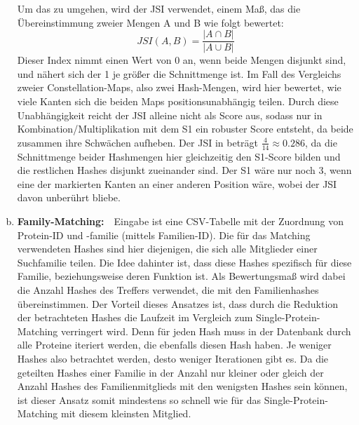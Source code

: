 \begin{enumerate}[a)]
                Um das zu umgehen, wird der \ac{JSI} verwendet, einem Maß, das die Übereinstimmung zweier Mengen A und B wie folgt bewertet:
                \begin{equation}
                    \label{equ:jsi}
                    JSI(A, B)=\frac{|A \cap B|}{|A \cup B|}
                \end{equation}
                Dieser Index nimmt einen Wert von 0 an, wenn beide Mengen disjunkt sind, und nähert sich der 1 je größer die Schnittmenge ist. Im Fall des Vergleichs zweier Constellation-Maps, also zwei Hash-Mengen, wird hier bewertet, wie viele Kanten sich die beiden Maps positionsunabhängig teilen. Durch diese Unabhängigkeit reicht der JSI alleine nicht als Score aus, sodass nur in Kombination/Multiplikation mit dem S1 ein robuster Score entsteht, da beide zusammen ihre Schwächen aufheben. Der \ac{JSI} in  beträgt $\frac{4}{14} \approx 0.286$, da die Schnittmenge beider Hashmengen hier gleichzeitig den S1-Score bilden und die restlichen Hashes disjunkt zueinander sind. Der S1 wäre nur noch 3, wenn eine der markierten Kanten an einer anderen Position wäre, wobei der \ac{JSI} davon unberührt bliebe.

            \item {}
                \textbf{Family-Matching:}\ \ Eingabe ist eine \ac{CSV}-Tabelle mit der Zuordnung von Protein-ID und -familie (mittels Familien-ID). Die für das Matching verwendeten Hashes sind hier diejenigen, die sich alle Mitglieder einer Suchfamilie teilen. Die Idee dahinter ist, dass diese Hashes spezifisch für diese Familie, beziehungsweise deren Funktion ist. Als Bewertungsmaß wird dabei die Anzahl Hashes des Treffers verwendet, die mit den Familienhashes übereinstimmen. Der Vorteil dieses Ansatzes ist, dass durch die Reduktion der betrachteten Hashes die Laufzeit im Vergleich zum Single-Protein-Matching verringert wird. Denn für jeden Hash muss in der Datenbank durch alle Proteine iteriert werden, die ebenfalls diesen Hash haben. Je weniger Hashes also betrachtet werden, desto weniger Iterationen gibt es. Da die geteilten Hashes einer Familie in der Anzahl nur kleiner oder gleich der Anzahl Hashes des Familienmitglieds mit den wenigsten Hashes sein können, ist dieser Ansatz somit mindestens so schnell wie für das Single-Protein-Matching mit diesem kleinsten Mitglied.


\end{enumerate}
